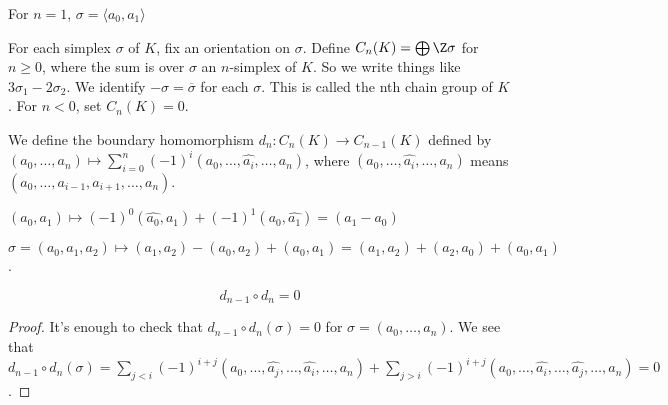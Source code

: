 \documentclass{article}
\numberwithin{nthm}{subsection}
\begin{document}
\begin{eg}
    For $n=1$, $\sigma = \langle a_0, a_1 \rangle$
\end{eg}

\begin{defi}
    For each simplex $\sigma$ of $K$, fix an orientation on $\sigma$.
    Define $C_n(K) = \bigoplus \Z \sigma$ for $n \geq 0$, where the sum is over $\sigma$ an $n$-simplex of $K$.
    So we write things like $3 \sigma_1 - 2 \sigma_2$.
    We identify $-\sigma = \overline{\sigma}$ for each $\sigma$.
    This is called the nth chain group of $K$. For $n < 0$, set $C_n(K) = 0$.
\end{defi}

\begin{defi}
    We define the boundary homomorphism
    $d_n: C_n(K) \to C_{n-1}(K)$
    defined by $(a_0, \dotsc, a_n) \mapsto \sum_{i=0}^n (-1)^i (a_0, \dotsc, \hat{a_i}, \dotsc, a_n)$, where
    $(a_0, \dotsc, \hat{a_i}, \dotsc, a_n)$ means $(a_0, \dotsc, a_{i-1}, a_{i+1}, \dotsc, a_n)$.
\end{defi}

\begin{eg}
    $(a_0, a_1) \mapsto (-1)^0 (\hat{a_0}, a_1) + (-1)^1 (a_0, \hat{a_1}) = (a_1 - a_0)$

    $\sigma = (a_0, a_1, a_2) \mapsto (a_1, a_2) - (a_0, a_2) + (a_0, a_1) = (a_1, a_2) + (a_2, a_0) + (a_0, a_1)$.

\end{eg}

\begin{lemma}
    \begin{equation*}
        d_{n-1} \circ d_n = 0
    \end{equation*}
\end{lemma}

\begin{proof}
    It's enough to check that $d_{n-1} \circ d_n(\sigma) = 0$ for $\sigma = (a_0, \dotsc, a_n)$.
    We see that $d_{n-1} \circ d_n(\sigma)= \sum_{j < i} (-1)^{i+j} (a_0, \dotsc, \hat{a_j}, \dotsc, \hat{a_i}, \dotsc, a_n) + \sum_{j > i} (-1)^{i+j} (a_0, \dotsc, \hat{a_i}, \dotsc, \hat{a_j}, \dotsc, a_n) = 0$.
\end{proof}
\end{document}
